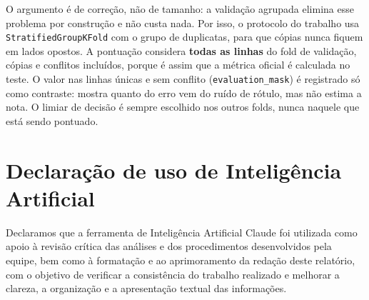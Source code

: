 \documentclass[11pt,a4paper]{article}
\begin{document}
O argumento é de correção, não de tamanho: a validação agrupada elimina esse problema por construção e não custa nada. Por isso, o protocolo do trabalho usa \texttt{StratifiedGroupKFold} com o grupo de duplicatas, para que cópias nunca fiquem em lados opostos. A pontuação considera \textbf{todas as linhas} do fold de validação, cópias e conflitos incluídos, porque é assim que a métrica oficial é calculada no teste. O valor nas linhas únicas e sem conflito (\texttt{evaluation\_mask}) é registrado só como contraste: mostra quanto do erro vem do ruído de rótulo, mas não estima a nota. O limiar de decisão é sempre escolhido nos outros folds, nunca naquele que está sendo pontuado.

\section*{Declaração de uso de Inteligência Artificial}

Declaramos que a ferramenta de Inteligência Artificial Claude
foi utilizada como apoio à revisão crítica das análises e
dos procedimentos desenvolvidos pela equipe, bem como à
formatação e ao aprimoramento da redação deste relatório,
com o objetivo de verificar a consistência do trabalho
realizado e melhorar a clareza, a organização e a
apresentação textual das informações.
\end{document}
